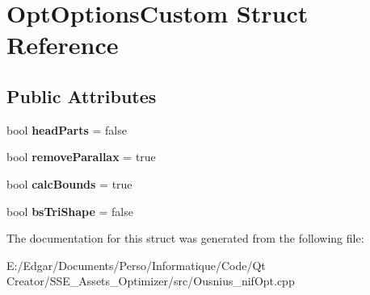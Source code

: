 \hypertarget{struct_opt_options_custom}{}\section{Opt\+Options\+Custom Struct Reference}
\label{struct_opt_options_custom}
\subsection*{Public Attributes}
\begin{DoxyCompactItemize}
\item 
\mbox{\label{struct_opt_options_custom_a40b812ac6a0ffb5c8775767198b28ff9}} 
bool {\bfseries head\+Parts} = false
\item 
\mbox{\label{struct_opt_options_custom_aac41071352f8d3ad70d14a6f26ae6957}} 
bool {\bfseries remove\+Parallax} = true
\item 
\mbox{\label{struct_opt_options_custom_acd3b2214f1655932c55c92e8681b70be}} 
bool {\bfseries calc\+Bounds} = true
\item 
\mbox{\label{struct_opt_options_custom_a336e622919017c020598187f3feafcb5}} 
bool {\bfseries bs\+Tri\+Shape} = false
\end{DoxyCompactItemize}


The documentation for this struct was generated from the following file\+:\begin{DoxyCompactItemize}
\item 
E\+:/\+Edgar/\+Documents/\+Perso/\+Informatique/\+Code/\+Qt Creator/\+S\+S\+E\+\_\+\+Assets\+\_\+\+Optimizer/src/Ousnius\+\_\+nif\+Opt.\+cpp\end{DoxyCompactItemize}
